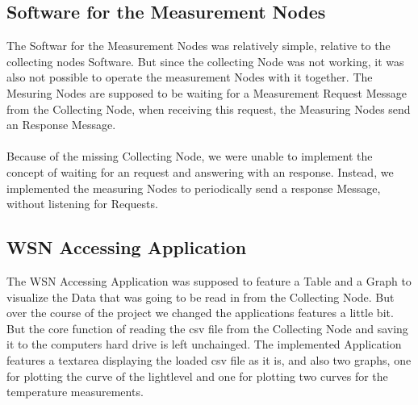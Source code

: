\documentclass[
	11pt,
	a4paper
]{article}%
\begin{document}
\subsection{Software for the Measurement Nodes}

The Softwar for the Measurement Nodes was relatively simple, relative to the collecting nodes Software. But since the collecting Node was not working, it was also not possible to operate the measurement Nodes with it together. The Mesuring Nodes are supposed to be waiting for a Measurement Request Message from the Collecting Node, when receiving this request, the Measuring Nodes send an Response Message.
\\\\
Because of the missing Collecting Node, we were unable to implement the concept of waiting for an request and answering with an response. Instead, we implemented the measuring Nodes to periodically send a response Message, without listening for Requests.


\subsection{WSN Accessing Application}

The WSN Accessing Application was supposed to feature a Table and a Graph to visualize the Data that was going to be read in from the Collecting Node. But over the course of the project we changed the applications features a little bit. But the core function of reading the csv file from the Collecting Node and saving it to the computers hard drive is left unchainged. The implemented Application features a textarea displaying the loaded csv file as it is, and also two graphs, one for plotting the curve of the lightlevel and one for plotting two curves for the temperature measurements.

\newpage
\end{document}
